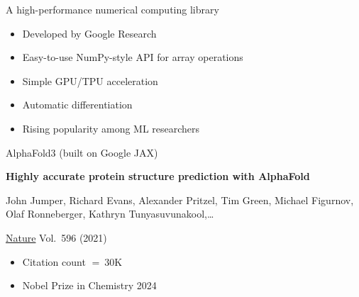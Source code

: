 \begin{frame}
    
    A high-performance numerical computing library 

            \vspace{0.5em}
            \vspace{0.5em}
    \begin{itemize}
        \item Developed by Google Research
            \vspace{0.5em}
        \item Easy-to-use NumPy-style API for array operations
            \vspace{0.5em}
        \item Simple GPU/TPU acceleration 
            \vspace{0.5em}
        \item Automatic differentiation
            \vspace{0.5em}
        \item Rising popularity among ML researchers
    \end{itemize}

\end{frame}

\begin{frame}
    
    \Eg AlphaFold3 (built on Google JAX)

        \vspace{0.5em}
    \textbf{Highly accurate protein structure prediction with AlphaFold}

        \vspace{0.5em}
    John Jumper, Richard Evans, Alexander Pritzel, Tim Green, Michael Figurnov,
    Olaf Ronneberger, Kathryn Tunyasuvunakool,\ldots 

        \vspace{0.5em}
    \underline{Nature} Vol.\ 596 (2021)

    \vspace{0.5em}
    \vspace{0.5em}
    \vspace{0.5em}
    \vspace{0.5em}
    \begin{itemize}
        \item Citation count $= ~30$K
        \vspace{0.5em}
        \item Nobel Prize in Chemistry 2024
    \end{itemize}

\end{frame}



